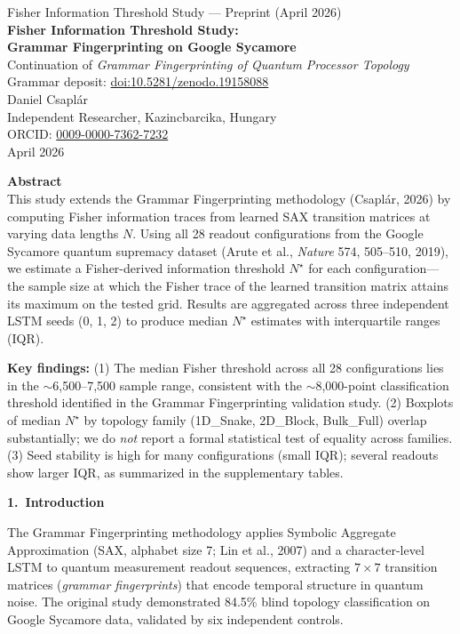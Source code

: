 \documentclass[11pt,a4paper]{article}
\begin{document}
\begin{center}
{\large Fisher Information Threshold Study --- Preprint (April 2026)}\\[1.2em]
{\LARGE\bfseries Fisher Information Threshold Study:\\[0.25em]
Grammar Fingerprinting on Google Sycamore}\\[0.9em]
{\large Continuation of \textit{Grammar Fingerprinting of Quantum Processor Topology}}\\[0.35em]
{\small Grammar deposit: \href{https://doi.org/10.5281/zenodo.19158088}{doi:10.5281/zenodo.19158088}}\\[1em]
Daniel Csapl\'ar\\
Independent Researcher, Kazincbarcika, Hungary\\
ORCID: \href{https://orcid.org/0009-0000-7362-7232}{0009-0000-7362-7232}\\
April 2026
\end{center}

\vspace{0.8em}
\textbf{Abstract}\\[0.3em]
This study extends the Grammar Fingerprinting methodology (Csapl\'ar, 2026) by computing Fisher information traces from learned SAX transition matrices at varying data lengths $N$. Using all 28 readout configurations from the Google Sycamore quantum supremacy dataset (Arute et al., \textit{Nature} 574, 505--510, 2019), we estimate a Fisher-derived information threshold $N^\star$ for each configuration---the sample size at which the Fisher trace of the learned transition matrix attains its maximum on the tested grid. Results are aggregated across three independent LSTM seeds (0, 1, 2) to produce median $N^\star$ estimates with interquartile ranges (IQR).

\textbf{Key findings:} (1) The median Fisher threshold across all 28 configurations lies in the $\sim$6{,}500--7{,}500 sample range, consistent with the $\sim$8{,}000-point classification threshold identified in the Grammar Fingerprinting validation study. (2) Boxplots of median $N^\star$ by topology family (1D\_Snake, 2D\_Block, Bulk\_Full) overlap substantially; we do \emph{not} report a formal statistical test of equality across families. (3) Seed stability is high for many configurations (small IQR); several readouts show larger IQR, as summarized in the supplementary tables.

\vspace{0.6em}
\textbf{1.\ Introduction}

The Grammar Fingerprinting methodology applies Symbolic Aggregate Approximation (SAX, alphabet size 7; Lin et al., 2007) and a character-level LSTM to quantum measurement readout sequences, extracting $7\times 7$ transition matrices (\emph{grammar fingerprints}) that encode temporal structure in quantum noise. The original study demonstrated 84.5\% blind topology classification on Google Sycamore data, validated by six independent controls.
\end{document}
